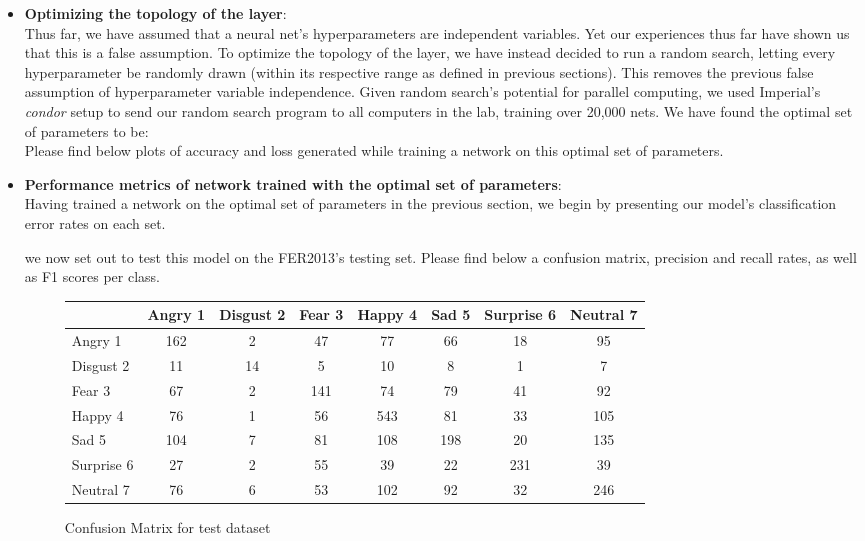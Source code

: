 \begin{itemize}[topsep=-10pt]
\item \textbf{Optimizing the topology of the layer}:\\
  Thus far, we have assumed that a neural net's hyperparameters are independent variables.
  Yet our experiences thus far have shown us that this is a false assumption.
  To optimize the topology of the layer, we have instead decided to run a random search,
  letting every hyperparameter be randomly drawn (within its respective range as defined in previous sections).
  This removes the previous false assumption of hyperparameter variable independence.
  Given random search's potential for parallel computing, we used Imperial's \emph{condor} setup to send our random search program
  to all computers in the lab, training over 20,000 nets.
  We have found the optimal set of parameters to be:\\
  Please find below plots of accuracy and loss generated
  while training a network on this optimal set of parameters.

  
\item \textbf{Performance metrics of network trained with the optimal set of parameters}:\\
  Having trained a network on the optimal set of parameters in the previous section,
  we begin by presenting our model's classification error rates on each set.
  
  we now set out to test this model on the FER2013's testing set.
  Please find below a confusion matrix, precision and recall rates, as well as F1 scores per class.
  \begin{figure}[h]
  \begin{center}
    \caption{Confusion Matrix for test dataset}
    \begin{tabular}{ | l || c | c | c | c | c | c | c |}
    \hline
          & Angry 1 & Disgust 2 & Fear 3 & Happy 4 & Sad 5 & Surprise 6 & Neutral 7 \\ \hline \hline
        Angry 1 & 162 & 2 & 47 & 77 & 66 & 18 & 95 \\ \hline
        Disgust 2 & 11 & 14 & 5 & 10 & 8 & 1 & 7 \\ \hline
        Fear 3 & 67 & 2 & 141 & 74 & 79 & 41 & 92 \\ \hline
        Happy 4 & 76 & 1 & 56 & 543 & 81 & 33 & 105 \\ \hline
        Sad 5 & 104 & 7 & 81 & 108 & 198 & 20 & 135 \\ \hline
        Surprise 6 & 27 & 2 & 55 & 39 & 22 & 231 & 39 \\ \hline
        Neutral 7 & 76 & 6 & 53 & 102 & 92 & 32 & 246 \\ \hline
    \end{tabular}
    \label{fig:confusionMatrix}
\end{center}
\end{figure}



\end{itemize}
